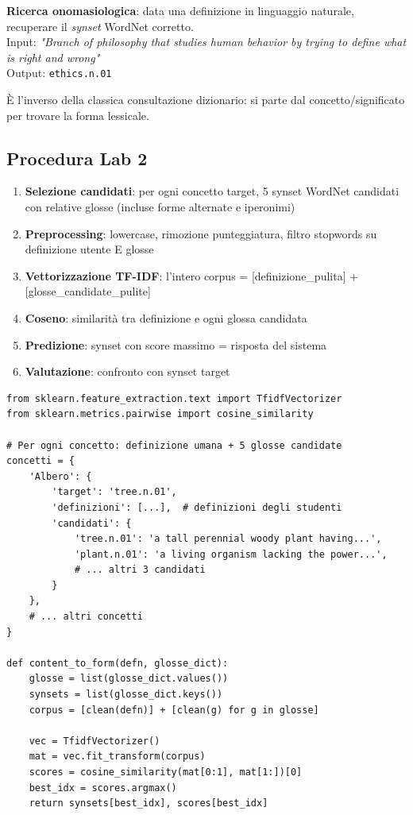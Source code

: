 \documentclass[12pt,a4paper]{article}
\begin{document}
\begin{defbox}
\textbf{Ricerca onomasiologica}: data una definizione in linguaggio naturale, recuperare il \emph{synset} WordNet corretto.\\[4pt]
Input: \textit{"Branch of philosophy that studies human behavior by trying to define what is right and wrong"} \\
Output: \texttt{ethics.n.01}
\end{defbox}

\`E l'inverso della classica consultazione dizionario: si parte dal concetto/significato per trovare la forma lessicale.

\subsection{Procedura Lab 2}

\begin{enumerate}
  \item \textbf{Selezione candidati}: per ogni concetto target, 5 synset WordNet candidati con relative glosse (incluse forme alternate e iperonimi)
  \item \textbf{Preprocessing}: lowercase, rimozione punteggiatura, filtro stopwords su definizione utente E glosse
  \item \textbf{Vettorizzazione TF-IDF}: l'intero corpus = [definizione\_pulita] + [glosse\_candidate\_pulite]
  \item \textbf{Coseno}: similarit\`a tra definizione e ogni glossa candidata
  \item \textbf{Predizione}: synset con score massimo = risposta del sistema
  \item \textbf{Valutazione}: confronto con synset target
\end{enumerate}

\begin{codebox}
\begin{lstlisting}[style=python]
from sklearn.feature_extraction.text import TfidfVectorizer
from sklearn.metrics.pairwise import cosine_similarity

# Per ogni concetto: definizione umana + 5 glosse candidate
concetti = {
    'Albero': {
        'target': 'tree.n.01',
        'definizioni': [...],  # definizioni degli studenti
        'candidati': {
            'tree.n.01': 'a tall perennial woody plant having...',
            'plant.n.01': 'a living organism lacking the power...',
            # ... altri 3 candidati
        }
    },
    # ... altri concetti
}

def content_to_form(defn, glosse_dict):
    glosse = list(glosse_dict.values())
    synsets = list(glosse_dict.keys())
    corpus = [clean(defn)] + [clean(g) for g in glosse]

    vec = TfidfVectorizer()
    mat = vec.fit_transform(corpus)
    scores = cosine_similarity(mat[0:1], mat[1:])[0]
    best_idx = scores.argmax()
    return synsets[best_idx], scores[best_idx]
\end{lstlisting}
\end{codebox}
\end{document}
